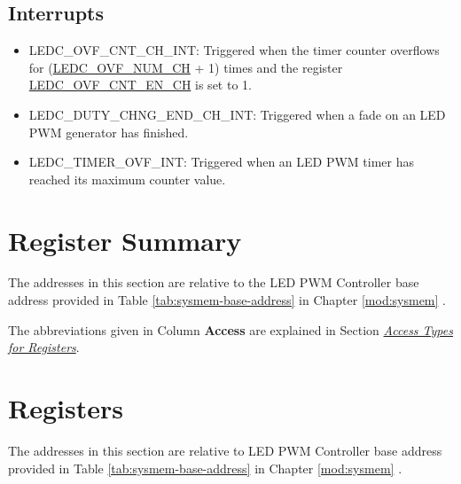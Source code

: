 \documentclass[main\_\_EN.tex]{subfiles}
\begin{document}
\subsection{Interrupts}
\begin{itemize}
\item \label{int:ledc-ovf-cnt}LEDC\_OVF\_CNT\_CH\_INT: Triggered when the timer counter overflows for (\hyperref[fielddesc:LEDCOVFNUMCHN]{LEDC\_OVF\_NUM\_CH} + 1) times and the register \hyperref[fielddesc:LEDCOVFCNTENCHN]{LEDC\_OVF\_CNT\_EN\_CH} is set to 1.
\item \label{int:ledc-duty-chng-end}LEDC\_DUTY\_CHNG\_END\_CH\_INT: Triggered when a fade on an LED PWM generator has finished.
\item \label{int:ledc-timer-ovf}LEDC\_TIMER\_OVF\_INT: Triggered when an LED PWM timer has reached its maximum counter value.
\end{itemize}



\clearpage
\hypertarget{ledpwm-reg-summ}{}
\section{Register Summary}
\label{sec:ledpwm-reg-summ}


The addresses in this section are relative to the LED PWM Controller base address provided in Table \ref{tab:sysmem-base-address} in Chapter \ref{mod:sysmem} \textit{}.

The abbreviations given in Column \textbf{Access} are explained in Section \hyperref[glossary-access-types]{\textit{Access Types for Registers}}.





\clearpage
\section{Registers}

The addresses in this section are relative to LED PWM Controller base address provided in Table \ref{tab:sysmem-base-address} in Chapter \ref{mod:sysmem} \textit{}.


\end{document}
